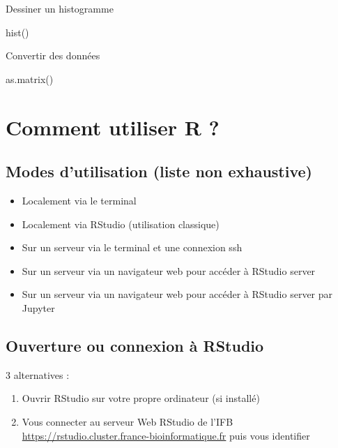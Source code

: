 \documentclass[
]{book}
\newenvironment{Shaded}{\begin{snugshade}}{\end{snugshade}}
\newcommand{\FunctionTok}[1]{\textcolor[rgb]{0.00,0.00,0.00}{#1}}
\newcommand{\NormalTok}[1]{#1}
\providecommand{\tightlist}{%
  \setlength{\itemsep}{0pt}\setlength{\parskip}{0pt}}
\begin{document}
Dessiner un histogramme

\begin{Shaded}
\begin{Highlighting}[]
\FunctionTok{hist}\NormalTok{()}
\end{Highlighting}
\end{Shaded}

Convertir des données

\begin{Shaded}
\begin{Highlighting}[]
\FunctionTok{as.matrix}\NormalTok{()}
\end{Highlighting}
\end{Shaded}

\hypertarget{comment-utiliser-r}{%
\chapter{Comment utiliser R ?}\label{comment-utiliser-r}}

\hypertarget{modes-dutilisation-liste-non-exhaustive}{%
\section{Modes d'utilisation (liste non exhaustive)}\label{modes-dutilisation-liste-non-exhaustive}}

\begin{itemize}
\tightlist
\item
  Localement via le terminal
\item
  Localement via RStudio (utilisation classique)
\item
  Sur un serveur via le terminal et une connexion ssh
\item
  Sur un serveur via un navigateur web pour accéder à RStudio server
\item
  Sur un serveur via un navigateur web pour accéder à RStudio server par Jupyter
\end{itemize}

\hypertarget{ouverture-ou-connexion-uxe0-rstudio}{%
\section{Ouverture ou connexion à RStudio}\label{ouverture-ou-connexion-uxe0-rstudio}}

3 alternatives :

\begin{enumerate}
\def\labelenumi{\arabic{enumi}.}
\item
  Ouvrir RStudio sur votre propre ordinateur (si installé)
\item
  Vous connecter au serveur Web RStudio de l'IFB
  \url{https://rstudio.cluster.france-bioinformatique.fr}
  puis vous identifier
\end{enumerate}
\end{document}
